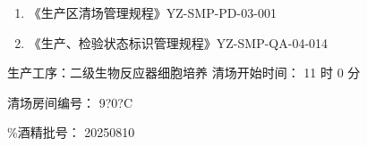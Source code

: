 \documentclass[UTF8,10pt,a4paper,fontset=fandol]{ctexart}
\newcommand{\fieldvalue}[1]{#1}
\newcommand{\handwritten}[1]{#1}
\begin{document}
\begin{enumerate}
\item 《生产区清场管理规程》\hfill YZ-SMP-PD-03-001
\item 《生产、检验状态标识管理规程》\hfill YZ-SMP-QA-04-014
\end{enumerate}

\noindent
生产工序：二级生物反应器细胞培养\hfill
清场开始时间：
\fieldvalue{\handwritten{11 时 0 分}}

\noindent
清场房间编号：
\fieldvalue{\handwritten{9?0?C}}

\%酒精批号：
\fieldvalue{\handwritten{20250810}}
\end{document}

